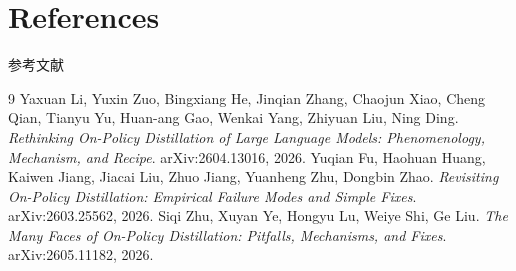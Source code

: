 \documentclass{beamer}
\begin{document}
\section{References}
\begin{frame}[allowframebreaks]{参考文献}
  \footnotesize
  \begin{thebibliography}{9}
     Yaxuan Li, Yuxin Zuo, Bingxiang He, Jinqian Zhang, Chaojun Xiao, Cheng Qian, Tianyu Yu, Huan-ang Gao, Wenkai Yang, Zhiyuan Liu, Ning Ding. \textit{Rethinking On-Policy Distillation of Large Language Models: Phenomenology, Mechanism, and Recipe}. arXiv:2604.13016, 2026.
     Yuqian Fu, Haohuan Huang, Kaiwen Jiang, Jiacai Liu, Zhuo Jiang, Yuanheng Zhu, Dongbin Zhao. \textit{Revisiting On-Policy Distillation: Empirical Failure Modes and Simple Fixes}. arXiv:2603.25562, 2026.
     Siqi Zhu, Xuyan Ye, Hongyu Lu, Weiye Shi, Ge Liu. \textit{The Many Faces of On-Policy Distillation: Pitfalls, Mechanisms, and Fixes}. arXiv:2605.11182, 2026.
  \end{thebibliography}
\end{frame}
\end{document}
